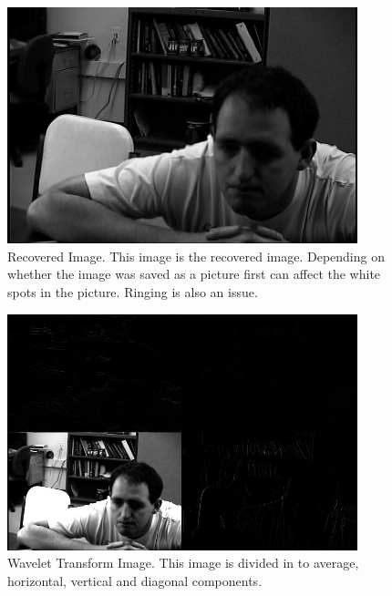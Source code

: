 \begin{figure}[htb]
\begin{center}
\includegraphics [width=4in]{revRecover.jpg}
\end{center}
\caption{Recovered Image.  This image is the recovered image.  Depending on whether the image was saved as a picture first can affect the white spots in the picture.  Ringing is also an issue.  }
\label{rightDanRecovered}
\end{figure}

\begin{figure}[htb]
\begin{center}
\includegraphics [width=4in]{revWavepic.jpg}
\end{center}
\caption{Wavelet Transform Image.  This image is divided in to average, horizontal, vertical and diagonal components. }
\label{rightWavepic}
\end{figure}


